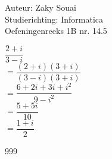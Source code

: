 \documentclass[a4paper]{article}
\begin{document}
\noindent \large Auteur: Zaky Souai \\
\noindent \large Studierichting: Informatica\\
\noindent \large Oefeningenreeks 1B nr. 14.5\\

\medskip

\normalsize
	$\dfrac{2 + i}{3 - i} $ \\
    
    $ = \dfrac{(2 + i)(3 + i)}{(3 - i)(3 + i)} $ \\
    
    $ = \dfrac{6 + 2i + 3i + i^2}{9 - i^2} $ \\ 
    
    $ = \dfrac{5 + 5i}{10} $ \\ 
    
    $ = \dfrac{1 + i}{2} $ \\ 
\begin{thebibliography}{999}
\end{thebibliography}
\end{document}
